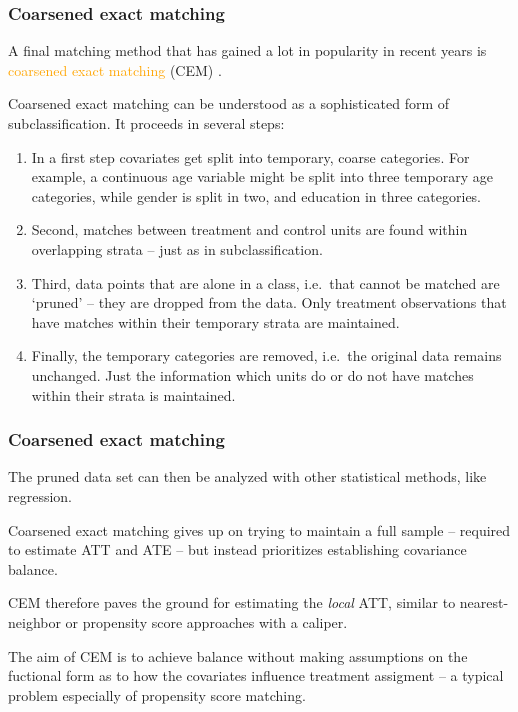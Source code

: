 \documentclass[12pt,english,dvipsnames,aspectratio=169,handout]{beamer}\usepackage[]{graphicx}\usepackage[]{xcolor}
\begin{document}
\begin{frame}
  \frametitle{Coarsened exact matching}
\footnotesize
A final matching method that has gained a lot in popularity in recent years is \textcolor{orange}{coarsened exact matching} (CEM) \cite{iacus_causal_2012}.

Coarsened exact matching can be understood as a sophisticated form of subclassification. It proceeds in several steps:

\begin{enumerate} \scriptsize
\item In a first step covariates get split into temporary, coarse categories. For example, a continuous age variable might be split into three temporary age categories, while gender is split in two, and education in three categories. 
\item Second, matches between treatment and control units are found within overlapping strata -- just as in subclassification. 
\item  Third, data points that are alone in a class, i.e.\ that cannot be matched are `pruned' -- they are dropped from the data. Only treatment observations that have matches within their temporary strata are maintained. 
\item Finally, the temporary categories are removed, i.e.\ the original data remains unchanged. Just the information which units do or do not have matches within their strata is maintained.
\end{enumerate}

\end{frame}



\begin{frame}
  \frametitle{Coarsened exact matching}
\footnotesize

The pruned data set can then be analyzed with other statistical methods, like regression. 

Coarsened exact matching gives up on trying to maintain a full sample -- required to estimate ATT and ATE -- but instead prioritizes establishing covariance balance. 

CEM therefore paves the ground for estimating the \emph{local} ATT, similar to nearest-neighbor or propensity score approaches with a caliper.

The aim of CEM is to achieve balance without making assumptions on the fuctional form as to how the covariates influence treatment assigment -- a typical problem especially of propensity score matching.

\end{frame}
\end{document}
